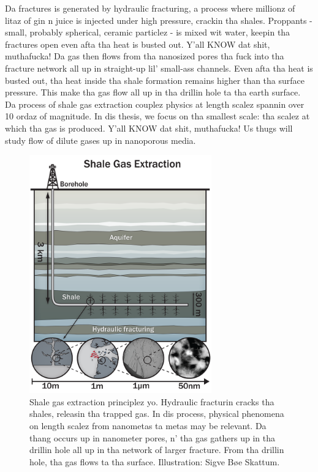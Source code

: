 Da fractures is generated by hydraulic fracturing, a process where millionz of litaz of gin n juice is injected under high pressure, crackin tha shales. Proppants - small, probably spherical, ceramic particlez - is mixed wit water, keepin tha fractures open even afta tha heat is busted out. Y'all KNOW dat shit, muthafucka! Da gas then flows from tha nanosized pores tha fuck into tha fracture network all up in straight-up lil' small-ass channels. Even afta tha heat is busted out, tha heat inside tha shale formation remains higher than tha surface pressure. This make tha gas flow all up in tha drillin hole ta tha earth surface. Da process of shale gas extraction couplez physics at length scalez spannin over 10 ordaz of magnitude. In dis thesis, we focus on tha smallest scale: tha scalez at  
which tha gas is produced. Y'all KNOW dat shit, muthafucka! Us thugs will study flow of dilute gases up in nanoporous media.

\begin{figure}[H]
\begin{center}
\includegraphics[width=0.7\textwidth, trim=0cm 0cm 0cm 0cm, clip]{figures/shale_gas_extraction.png}
\end{center}
\caption{Shale gas extraction principlez yo. Hydraulic fracturin cracks tha shales, releasin tha trapped gas. In dis process, physical phenomena on length scalez from nanometas ta metas may be relevant. Da thang occurs up in nanometer pores, n' tha gas gathers up in tha drillin hole all up in tha network of larger fracture. From tha drillin hole, tha gas flows ta tha surface. Illustration: Sigve B{\o}e Skattum.}
\label{fig:shale_gas_extraction}
\end{figure}

